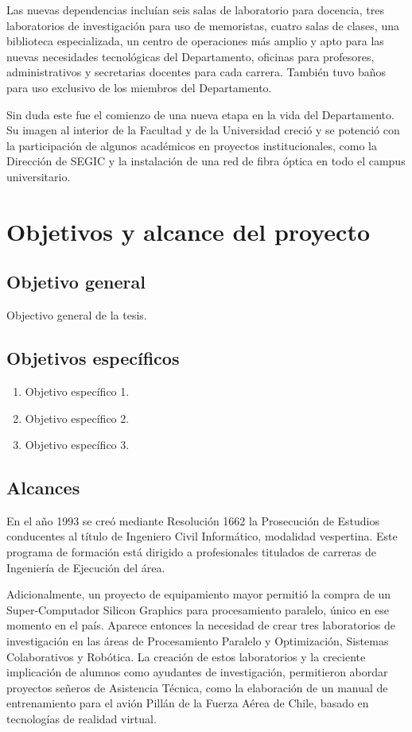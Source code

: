 Las nuevas dependencias incluían seis salas de laboratorio para docencia, tres laboratorios de investigación para uso de memoristas, cuatro salas de clases, una biblioteca especializada, un centro de operaciones más amplio y apto para las nuevas necesidades tecnológicas del Departamento, oficinas para profesores, administrativos y secretarias docentes para cada carrera. También tuvo baños para uso exclusivo de los miembros del Departamento.

Sin duda este fue el comienzo de una nueva etapa en la vida del Departamento. Su imagen al interior de la Facultad y de la Universidad creció y se potenció con la participación de algunos académicos en proyectos institucionales, como la Dirección de SEGIC y la instalación de una red de fibra óptica en todo el campus universitario.


\section{Objetivos y alcance del proyecto}
\label{intro:objetivos}

\subsection{Objetivo general}
	Objectivo general de la tesis.

\subsection{Objetivos espec\'ificos}
\begin{enumerate}
	\item Objetivo espec\'ifico 1.
	\item Objetivo espec\'ifico 2.
	\item Objetivo espec\'ifico 3.
\end{enumerate}

\subsection{Alcances}
En el año 1993 se creó mediante Resolución 1662 la Prosecución de Estudios conducentes al título de Ingeniero Civil Informático, modalidad vespertina. Este programa de formación está dirigido a profesionales titulados de carreras de Ingeniería de Ejecución del área.

Adicionalmente, un proyecto de equipamiento mayor permitió la compra de un Super-Computador Silicon Graphics para procesamiento paralelo, único en ese momento en el país. Aparece entonces la necesidad de crear tres laboratorios de investigación en las áreas de Procesamiento Paralelo y Optimización, Sistemas Colaborativos y Robótica. La creación de estos laboratorios y la creciente implicación de alumnos como ayudantes de investigación, permitieron abordar proyectos señeros de Asistencia Técnica, como la elaboración de un manual de entrenamiento para el avión Pillán de la Fuerza Aérea de Chile, basado en tecnologías de realidad virtual.

